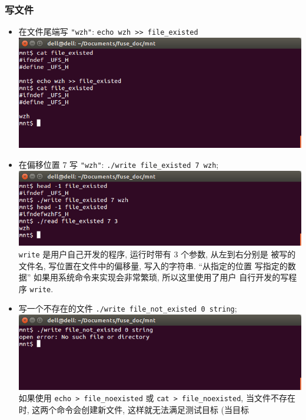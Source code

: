 \documentclass[nofonts, titlepage]{ctexart}
\begin{document}
\subsubsection{写文件}
\begin{itemize}
    \item 在文件尾端写 \verb'"wzh"': \verb'echo wzh >> file_existed' \\
        \includegraphics[width=14cm]{./images/write_t0.png}
\item
  在偏移位置 7 写 \verb'"wzh"': \texttt{./write file\_existed 7 wzh};\\
  \includegraphics[width=14cm]{./images/./write_t1.png} \\
  \texttt{write} 是用户自己开发的程序, 运行时带有 3 个参数, 从左到右分别是
  被写的文件名, 写位置在文件中的偏移量, 写入的字符串. ``从指定的位置
  写指定的数据'' 如果用系统命令来实现会非常繁琐, 所以这里使用了用户
  自行开发的写程序 \texttt{write}.
\item
  写一个不存在的文件 \texttt{./write file\_not\_existed 0 string};\\
  \includegraphics[width=14cm]{./images/./write_t2.png} \\
  如果使用 \verb'echo > file_noexisted' 或 \verb'cat > file_noexisted',
  当文件不存在时, 这两个命令会创建新文件, 这样就无法满足测试目标 (当目标

\end{itemize}
\end{document}
